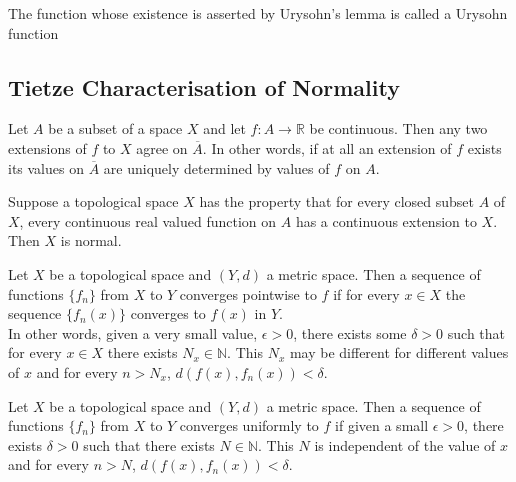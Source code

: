 \begin{remark}
	The function whose existence is asserted by Urysohn's lemma is called a Urysohn function
\end{remark}

\subsection{Tietze Characterisation of Normality}
\begin{proposition}
	Let \( A \) be a subset of a space \( X \) and let \( f : A \to \mathbb{R} \) be continuous. Then any two extensions of \( f \) to \( X \) agree on \( \overline{A} \). In other words, if at all an extension of \( f \) exists its values on \( \overline{A} \) are uniquely determined by values of \( f \) on \( A \).
\end{proposition}

\begin{proposition}
	Suppose a topological space \( X \) has the property that for every closed subset \( A \) of \( X \), every continuous real valued function on \( A \) has a continuous extension to \( X \). Then \( X \) is normal.
\end{proposition}

\begin{definition}
	Let \( X \) be a topological space and \( (Y,d) \) a metric space. Then a sequence of functions \( \{ f_n \} \) from \( X \) to \( Y \) converges pointwise to \( f \) if for every \( x \in X \) the sequence \( \{ f_n(x) \} \) converges to \( f(x) \) in \( Y \).\\
	
	In other words, given a very small value, \( \epsilon > 0 \), there exists some \( \delta > 0 \) such that for every \( x \in X \) there exists \( N_x \in \mathbb{N} \). This \( N_x \) may be different for different values of \( x \) and for every \( n > N_x \), \( d(f(x),f_n(x)) < \delta \).
\end{definition}

\begin{definition}
	Let \( X \) be a topological space and \( (Y,d) \) a metric space. Then a sequence of functions \( \{ f_n \} \) from \( X \) to \( Y \) converges uniformly to \( f \) if given a small \( \epsilon > 0 \), there exists \( \delta > 0 \) such that there exists \( N \in \mathbb{N} \). This $N$ is independent of the value of \( x \) and for every \( n > N \), \( d(f(x),f_n(x)) < \delta \).
\end{definition}

